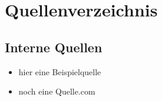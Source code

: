 %
%

\section{Quellenverzeichnis}

\subsection{Interne Quellen}
\begin{itemize}
  \item hier eine Beispielquelle
  \item noch eine Quelle.com
\end{itemize}
